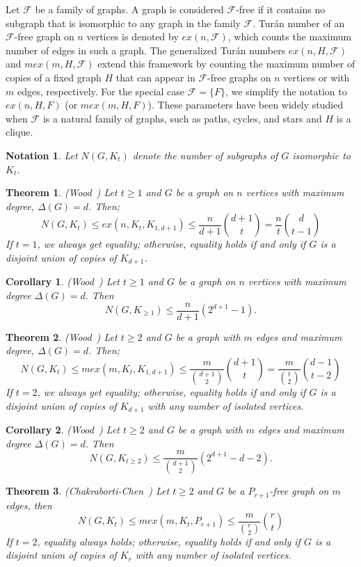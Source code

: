 \documentclass[pdflatex,sn-basic,Numbered]{sn-jnl}
\newtheorem{theorem}{Theorem}
\newtheorem{corollary}{Corollary}
\newtheorem{notation}{Notation}
\begin{document}
Let $\mathcal{F}$ be a family of graphs. A graph is considered $\mathcal{F}$-free if it contains no subgraph that is isomorphic to any graph in the family $\mathcal{F}$. Tur\'{a}n number of an $\mathcal{F}$-free graph on $n$ vertices is denoted by $ex(n,\mathcal{F})$, which counts the maximum number of edges in such a graph. The generalized Tur\'{a}n numbers $ex(n,H,\mathcal{F})$ and $mex(m,H,\mathcal{F})$ extend this framework by counting the maximum number of copies of a fixed graph $H$ that can appear in $\mathcal{F}$-free graphs on $n$ vertices or with $m$ edges, respectively. For the special case $\mathcal{F} = \{F\}$, we simplify the notation to $ex(n,H,F)$ (or $mex(m,H,F)$).
These parameters have been widely studied when $\mathcal{F}$ is a natural family of graphs, such as paths, cycles, and stars and $H$ is a clique.
\begin{notation}
Let $N(G, K_t)$ denote the number of subgraphs of $G$ isomorphic to $K_t$.
   
\end{notation}
\begin{theorem}\label{wood1}\emph{(Wood~\cite{wood})} Let $t \geq 1$ and $G$ be a graph on $n$ vertices with maximum degree, $\Delta(G) = d$. Then;
\[N(G,K_t) \leq ex(n,K_t,K_{1,d+1})\leq \frac{n}{d+1}{d+1 \choose t} = \frac{n}{t}{d\choose t-1} \]
If $t = 1$, we always get equality; otherwise, equality holds if and only if $G$ is a disjoint union of copies of $K_{d+1}$. 
\end{theorem}
\begin{corollary}\label{WoodCor2}\emph{(Wood~\cite{wood})}
    Let $t \geq 1$ and $G$ be a graph on $n$ vertices with maximum degree $\Delta(G) = d$. Then  
    \[
        N(G,K_{\geq 1}) \leq \frac{n}{d+1}(2^{d+1}-1).
    \]
\end{corollary}
\begin{theorem}\label{wood2}\emph{(Wood~\cite{wood})} Let $t \geq 2$ and $G$ be a graph with $m$ edges and maximum degree, $\Delta(G) = d$. Then;
\[N(G,K_t) \leq mex(m,K_t,K_{1,d+1})\leq \frac{m}{{d+1 \choose 2}}{d+1 \choose t} = \frac{m}{{t\choose 2}}{d-1\choose t-2}\]
If $t = 2$, we always get equality; otherwise, equality holds if and only if $G$ is a disjoint union of copies of $K_{d+1}$ with any number of isolated vertices.
\end{theorem}
\begin{corollary}\label{WoodCor1}\emph{(Wood~\cite{wood})}
    Let $t \geq 2$ and $G$ be a graph with $m$ edges and maximum degree $\Delta(G) = d$. Then  
    \[
        N(G,K_{t \geq 2}) \leq \frac{m}{{d+1 \choose 2}}(2^{d+1}-d-2).
    \]
\end{corollary}
\begin{theorem}\label{chakchen}\emph{(Chakraborti-Chen~\cite{CHAKRABORTI2024103955})} Let $t \geq 2$ and $G$ be a $P_{r+1}$-free graph on $m$ edges, then
\[N(G,K_t) \leq mex(m,K_t,P_{r+1})\leq \frac{m}{{r\choose 2}}{r\choose t}\]
If $t =2$, equality always holds; otherwise, equality holds if and only if $G$ is a disjoint union of copies of $K_r$ with any number of isolated vertices.
    
\end{theorem}
\end{document}
